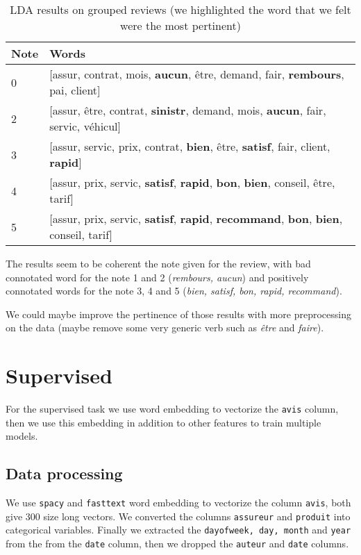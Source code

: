 \documentclass[a4paper, 12pt, one column]{article}
\begin{document}
\begin{table}[H]
\centering
\begin{tabular}{|p{1cm}|p{13cm}|}
\hline
\textbf{Note} & \textbf{Words} \\
\hline
    0 &    [assur, contrat, mois, \textbf{aucun}, être, demand, fair, \textbf{rembours}, pai, client] \\
    2 & [assur, être, contrat, \textbf{sinistr}, demand, mois, \textbf{aucun}, fair, servic, véhicul] \\
    3 &     [assur, servic, prix, contrat, \textbf{bien}, être, \textbf{satisf}, fair, client, \textbf{rapid}] \\
    4 &       [assur, prix, servic, \textbf{satisf}, \textbf{rapid}, \textbf{bon}, \textbf{bien}, conseil, être, tarif] \\
    5 &  [assur, prix, servic, \textbf{satisf}, \textbf{rapid}, \textbf{recommand}, \textbf{bon}, \textbf{bien}, conseil, tarif] \\
\hline
\end{tabular}
\label{tab:unsupervised_split}
\caption{LDA results on grouped reviews (we highlighted the word that we felt were the most pertinent)}
\end{table}

The results seem to be coherent the note given for the review, with bad connotated word for the note 1 and 2 (\textit{rembours, aucun}) and positively connotated words for the note 3, 4 and 5 (\textit{bien, satisf, bon, rapid, recommand}).

We could maybe improve the pertinence of those results with more preprocessing on the data (maybe remove some very generic verb such as \textit{être} and \textit{faire}). 

\newpage
\section{Supervised}

For the supervised task we use word embedding to vectorize the \lstinline{avis} column, then we use this embedding in addition to other features to train multiple models. 
\subsection{Data processing}

We use \lstinline{spacy} and \lstinline{fasttext} word embedding to vectorize the column \lstinline{avis}, both give 300 size long vectors. We converted the columns \lstinline{assureur} and \lstinline{produit} into categorical variables. 
Finally we extracted the \lstinline{dayofweek, day, month} and \lstinline{year} from the from the \lstinline{date} column, then we dropped the \lstinline{auteur} and \lstinline{date} columns. 
\end{document}
